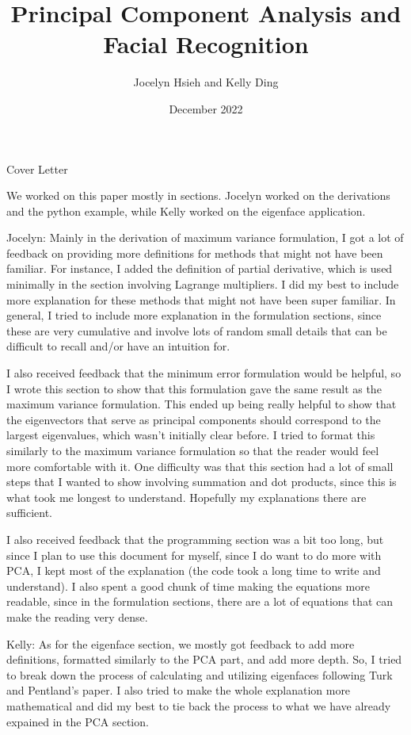 \documentclass{article}
\title{Principal Component Analysis and Facial Recognition}
\author{Jocelyn Hsieh and Kelly Ding}
\date{December 2022}
\begin{document}
\maketitle
\pagebreak

\begin{center}
    \Huge Cover Letter
\end{center}
We worked on this paper mostly in sections. Jocelyn worked on the derivations and the python example, while Kelly worked on the eigenface application.

Jocelyn: Mainly in the derivation of maximum variance formulation, I got a lot of feedback on providing more definitions for methods that might not have been familiar. For instance, I added the definition of partial derivative, which is used minimally in the section involving Lagrange multipliers. I did my best to include more explanation for these methods that might not have been super familiar. In general, I tried to include more explanation in the formulation sections, since these are very cumulative and involve lots of random small details that can be difficult to recall and/or have an intuition for. 

I also received feedback that the minimum error formulation would be helpful, so I wrote this section to show that this formulation gave the same result as the maximum variance formulation. This ended up being really helpful to show that the eigenvectors that serve as principal components should correspond to the largest eigenvalues, which wasn't initially clear before. I tried to format this similarly to the maximum variance formulation so that the reader would feel more comfortable with it. One difficulty was that this section had a lot of small steps that I wanted to show involving summation and dot products, since this is what took me longest to understand. Hopefully my explanations there are sufficient.

I also received feedback that the programming section was a bit too long, but since I plan to use this document for myself, since I do want to do more with PCA, I kept most of the explanation (the code took a long time to write and understand). I also spent a good chunk of time making the equations more readable, since in the formulation sections, there are a lot of equations that can make the reading very dense. 

Kelly: As for the eigenface section, we mostly got feedback to add more definitions, formatted similarly to the PCA part, and add more depth. So, I tried to break down the process of calculating and utilizing eigenfaces following Turk and Pentland's paper. I also tried to make the whole explanation more mathematical and did my best to tie back the process to what we have already expained in the PCA section. 
\end{document}
